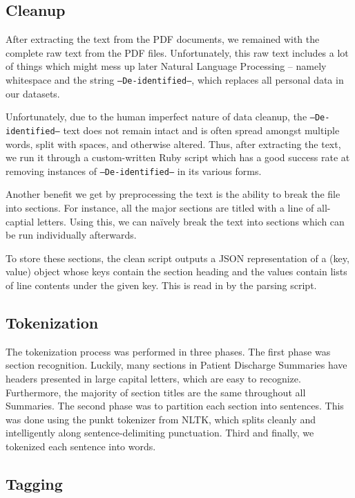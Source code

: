 \documentclass{acm_proc_article-sp}
\begin{document}
\subsection{Cleanup}
After extracting the text from the PDF documents, we remained with the complete raw text from the PDF files.
Unfortunately, this raw text includes a lot of things which might mess up later Natural Language Processing --
namely whitespace and the string \texttt{--De-identified--}, which replaces all personal data in our datasets.

Unfortunately, due to the human imperfect nature of data cleanup, the \texttt{--De-identified--} text does not remain
intact and is often spread amongst multiple words, split with spaces, and otherwise altered. Thus, after extracting
the text, we run it through a custom-written Ruby script which has a good success rate at removing instances of 
\texttt{--De-identified--} in its various forms.

Another benefit we get by preprocessing the text is the ability to break the file into sections. For instance,
all the major sections are titled with a line of all-captial letters. Using this, we can na{\"i}vely break the text
into sections which can be run individually afterwards.

To store these sections, the clean script outputs a JSON representation of a (key, value) object whose keys contain the
section heading and the values contain lists of line contents under the given key. This is read in by the parsing
script.

\subsection{Tokenization}
The tokenization process was performed in three phases. The first phase was section
recognition. Luckily, many sections in Patient Discharge Summaries have headers presented
in large capital letters, which are easy to recognize. Furthermore, the majority of
section titles are the same throughout all Summaries. The second phase was to partition
each section into sentences. This was done using the punkt tokenizer from NLTK,
which splits cleanly and intelligently along sentence-delimiting punctuation.
Third and finally, we tokenized each sentence into words.
\subsection{Tagging}
\end{document}
